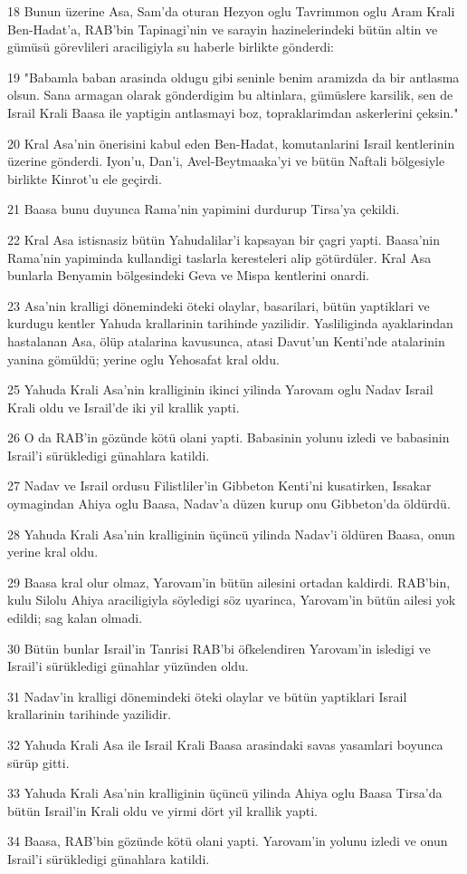 \par 18 Bunun üzerine Asa, Sam'da oturan Hezyon oglu Tavrimmon oglu Aram Krali Ben-Hadat'a, RAB'bin Tapinagi'nin ve sarayin hazinelerindeki bütün altin ve gümüsü görevlileri araciligiyla su haberle birlikte gönderdi:
\par 19 "Babamla baban arasinda oldugu gibi seninle benim aramizda da bir antlasma olsun. Sana armagan olarak gönderdigim bu altinlara, gümüslere karsilik, sen de Israil Krali Baasa ile yaptigin antlasmayi boz, topraklarimdan askerlerini çeksin."
\par 20 Kral Asa'nin önerisini kabul eden Ben-Hadat, komutanlarini Israil kentlerinin üzerine gönderdi. Iyon'u, Dan'i, Avel-Beytmaaka'yi ve bütün Naftali bölgesiyle birlikte Kinrot'u ele geçirdi.
\par 21 Baasa bunu duyunca Rama'nin yapimini durdurup Tirsa'ya çekildi.
\par 22 Kral Asa istisnasiz bütün Yahudalilar'i kapsayan bir çagri yapti. Baasa'nin Rama'nin yapiminda kullandigi taslarla keresteleri alip götürdüler. Kral Asa bunlarla Benyamin bölgesindeki Geva ve Mispa kentlerini onardi.
\par 23 Asa'nin kralligi dönemindeki öteki olaylar, basarilari, bütün yaptiklari ve kurdugu kentler Yahuda krallarinin tarihinde yazilidir. Yasliliginda ayaklarindan hastalanan Asa, ölüp atalarina kavusunca, atasi Davut'un Kenti'nde atalarinin yanina gömüldü; yerine oglu Yehosafat kral oldu.
\par 25 Yahuda Krali Asa'nin kralliginin ikinci yilinda Yarovam oglu Nadav Israil Krali oldu ve Israil'de iki yil krallik yapti.
\par 26 O da RAB'in gözünde kötü olani yapti. Babasinin yolunu izledi ve babasinin Israil'i sürükledigi günahlara katildi.
\par 27 Nadav ve Israil ordusu Filistliler'in Gibbeton Kenti'ni kusatirken, Issakar oymagindan Ahiya oglu Baasa, Nadav'a düzen kurup onu Gibbeton'da öldürdü.
\par 28 Yahuda Krali Asa'nin kralliginin üçüncü yilinda Nadav'i öldüren Baasa, onun yerine kral oldu.
\par 29 Baasa kral olur olmaz, Yarovam'in bütün ailesini ortadan kaldirdi. RAB'bin, kulu Silolu Ahiya araciligiyla söyledigi söz uyarinca, Yarovam'in bütün ailesi yok edildi; sag kalan olmadi.
\par 30 Bütün bunlar Israil'in Tanrisi RAB'bi öfkelendiren Yarovam'in isledigi ve Israil'i sürükledigi günahlar yüzünden oldu.
\par 31 Nadav'in kralligi dönemindeki öteki olaylar ve bütün yaptiklari Israil krallarinin tarihinde yazilidir.
\par 32 Yahuda Krali Asa ile Israil Krali Baasa arasindaki savas yasamlari boyunca sürüp gitti.
\par 33 Yahuda Krali Asa'nin kralliginin üçüncü yilinda Ahiya oglu Baasa Tirsa'da bütün Israil'in Krali oldu ve yirmi dört yil krallik yapti.
\par 34 Baasa, RAB'bin gözünde kötü olani yapti. Yarovam'in yolunu izledi ve onun Israil'i sürükledigi günahlara katildi.

